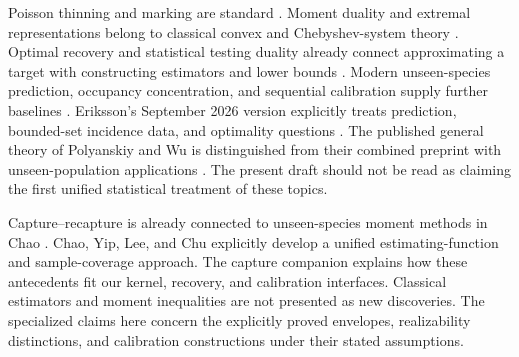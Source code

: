 \documentclass[11pt]{article}
\numberwithin{equation}{section}
\theoremstyle{definition}
\theoremstyle{remark}
\begin{document}
Poisson thinning and marking are standard \cite{LastPenrose2017}. Moment duality and extremal representations belong to classical convex and Chebyshev-system theory \cite{BertsimasPopescu2005,KarlinStudden1966,Pinelis2011}. Optimal recovery and statistical testing duality already connect approximating a target with constructing estimators and lower bounds \cite{Donoho1994,PolyanskiyWu2026,PolyanskiyWu2019}. Modern unseen-species prediction, occupancy concentration, and sequential calibration supply further baselines \cite{Orlitsky2016,BenHamou2017,Howard2021,Wasserman2020}. Eriksson's September 2026 version explicitly treats prediction, bounded-set incidence data, and optimality questions \cite{Eriksson2026}. The published general theory of Polyanskiy and Wu \cite{PolyanskiyWu2026} is distinguished from their combined preprint with unseen-population applications \cite{PolyanskiyWu2019}. The present draft should not be read as claiming the first unified statistical treatment of these topics.

Capture--recapture is already connected to unseen-species moment methods in
Chao \cite{ChaoCapture1987}. Chao, Yip, Lee, and Chu \cite{ChaoCapture2001}
explicitly develop a unified estimating-function and sample-coverage approach.
The capture companion \cite{LongCapture} explains how these antecedents fit
our kernel, recovery, and calibration interfaces. Classical estimators and
moment inequalities are not presented as new discoveries. The specialized
claims here concern the explicitly proved envelopes, realizability distinctions,
and calibration constructions under their stated assumptions.

\appendix
\end{document}
